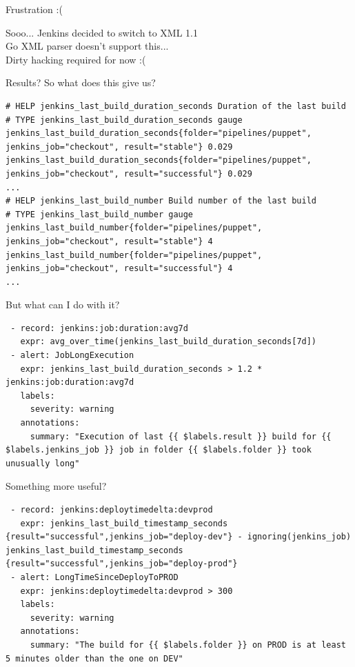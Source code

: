 \documentclass[aspectratio=169,12pt]{beamer}
\begin{document}
\begin{frame}{Frustration :(}
  \begin{center}
    Sooo... Jenkins decided to switch to XML 1.1 \\
    \vspace{20pt}
    Go XML parser doesn't support this... \\
    \vspace{20pt}
    Dirty hacking required for now :(
  \end{center}
\end{frame}

\begin{frame}[fragile]{Results?}
  So what does this give us?
  \begin{verbatim}
# HELP jenkins_last_build_duration_seconds Duration of the last build
# TYPE jenkins_last_build_duration_seconds gauge
jenkins_last_build_duration_seconds{folder="pipelines/puppet", jenkins_job="checkout", result="stable"} 0.029
jenkins_last_build_duration_seconds{folder="pipelines/puppet", jenkins_job="checkout", result="successful"} 0.029
...
# HELP jenkins_last_build_number Build number of the last build
# TYPE jenkins_last_build_number gauge
jenkins_last_build_number{folder="pipelines/puppet", jenkins_job="checkout", result="stable"} 4
jenkins_last_build_number{folder="pipelines/puppet", jenkins_job="checkout", result="successful"} 4
...
  \end{verbatim}
\end{frame}

\begin{frame}[fragile]{But what can I do with it?}
  \begin{verbatim}
 - record: jenkins:job:duration:avg7d
   expr: avg_over_time(jenkins_last_build_duration_seconds[7d])
 - alert: JobLongExecution
   expr: jenkins_last_build_duration_seconds > 1.2 * jenkins:job:duration:avg7d
   labels:
     severity: warning
   annotations:
     summary: "Execution of last {{ $labels.result }} build for {{ $labels.jenkins_job }} job in folder {{ $labels.folder }} took unusually long"
  \end{verbatim}
\end{frame}

\begin{frame}[fragile]{Something more useful?}
  \begin{verbatim}
 - record: jenkins:deploytimedelta:devprod
   expr: jenkins_last_build_timestamp_seconds {result="successful",jenkins_job="deploy-dev"} - ignoring(jenkins_job) jenkins_last_build_timestamp_seconds {result="successful",jenkins_job="deploy-prod"}
 - alert: LongTimeSinceDeployToPROD
   expr: jenkins:deploytimedelta:devprod > 300
   labels:
     severity: warning
   annotations:
     summary: "The build for {{ $labels.folder }} on PROD is at least 5 minutes older than the one on DEV"
  \end{verbatim}
\end{frame}
\end{document}
